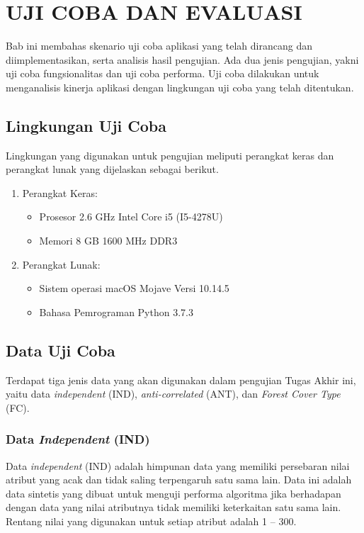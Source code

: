 \chapter{UJI COBA DAN EVALUASI}\label{chap:uji-coba-eval}

\tab Bab ini membahas skenario uji coba aplikasi yang telah dirancang dan diimplementasikan, serta analisis hasil pengujian. Ada dua jenis pengujian, yakni uji coba fungsionalitas dan uji coba performa. Uji coba dilakukan untuk menganalisis kinerja aplikasi dengan lingkungan uji coba yang telah ditentukan.

\section{Lingkungan Uji Coba}
\tab Lingkungan yang digunakan untuk pengujian meliputi perangkat keras dan
perangkat lunak yang dijelaskan sebagai berikut.

\begin{enumerate}
	\item Perangkat Keras:
	\begin{itemize}
		\item Prosesor 2.6 GHz Intel Core i5 (I5-4278U)
		\item Memori 8 GB 1600 MHz DDR3
	\end{itemize}
	\item Perangkat Lunak:
	\begin{itemize}
		\item Sistem operasi macOS Mojave Versi 10.14.5
		\item Bahasa Pemrograman Python 3.7.3
	\end{itemize}			
\end{enumerate}

\section{Data Uji Coba}

\tab Terdapat tiga jenis data yang akan digunakan dalam pengujian Tugas Akhir ini, yaitu data \textit{independent} (IND), \textit{anti-correlated} (ANT), dan \textit{Forest Cover Type} (FC).

\pagebreak
\subsection{Data \textit{Independent} (IND)}
\tab Data \textit{independent} (IND) adalah himpunan data yang memiliki persebaran nilai atribut yang acak dan tidak saling terpengaruh satu sama lain. Data ini adalah data sintetis yang dibuat untuk menguji performa algoritma jika berhadapan dengan data yang nilai atributnya tidak memiliki keterkaitan satu sama lain. Rentang nilai yang digunakan untuk setiap atribut adalah 1 – 300.

